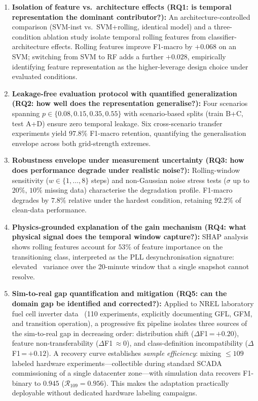 \documentclass[journal]{IEEEtran}
\newcommand{\rocof}{\text{RoCoF}}
\begin{document}
\begin{enumerate}

\item \textbf{Isolation of feature vs.\ architecture effects
(RQ1: is temporal representation the dominant contributor?):}
An architecture-controlled comparison (SVM-inst vs.\ SVM+rolling,
identical model) and a three-condition ablation study isolate temporal
rolling features from classifier-architecture effects.
Rolling features improve F1-macro by $+0.068$ on an SVM;
switching from SVM to RF adds a further $+0.028$,
empirically identifying feature representation as the higher-leverage
design choice under evaluated conditions.

\item \textbf{Leakage-free evaluation protocol with quantified generalization
(RQ2: how well does the representation generalise?):}
Four scenarios spanning $p \in \{0.08, 0.15, 0.35, 0.55\}$ with
scenario-based splits (train B+C, test A+D) ensure zero temporal leakage.
Six cross-scenario transfer experiments yield $97.8\%$ F1-macro retention,
quantifying the generalisation envelope across both grid-strength extremes.

\item \textbf{Robustness envelope under measurement uncertainty
(RQ3: how does performance degrade under realistic noise?):}
Rolling-window sensitivity ($w \in \{1,\ldots,8\}$ steps) and non-Gaussian
noise stress tests ($\sigma$ up to $20\%$, $10\%$ missing data)
characterise the degradation profile.
F1-macro degrades by $7.8\%$ relative under the hardest condition,
retaining $92.2\%$ of clean-data performance.

\item \textbf{Physics-grounded explanation of the gain mechanism
(RQ4: what physical signal does the temporal window capture?):}
SHAP analysis shows rolling features account for $53\%$ of feature
importance on the transitioning class, interpreted as the PLL
desynchronisation signature: elevated \rocof\ variance over the
20-minute window that a single snapshot cannot resolve.

\item \textbf{Sim-to-real gap quantification and mitigation
(RQ5: can the domain gap be identified and corrected?):}
Applied to NREL laboratory fuel cell inverter data~\cite{b_nrel253}
(110 experiments, explicitly documenting GFL, GFM, and transition operation),
a progressive fix pipeline isolates three sources of the sim-to-real gap
in decreasing order: distribution shift ($\Delta$F1\,=\,$+0.20$),
feature non-transferability ($\Delta$F1\,$\approx 0$), and
class-definition incompatibility ($\Delta$F1\,=\,$+0.12$).
A recovery curve establishes \emph{sample efficiency}:
mixing $\leq 109$ labeled hardware experiments---collectible during
standard SCADA commissioning of a single datacenter zone---with
simulation data recovers F1-binary to $0.945$ ($\mathcal{R}_{109} = 0.956$).
This makes the adaptation practically deployable without dedicated
hardware labeling campaigns.

\end{enumerate}
\end{document}
